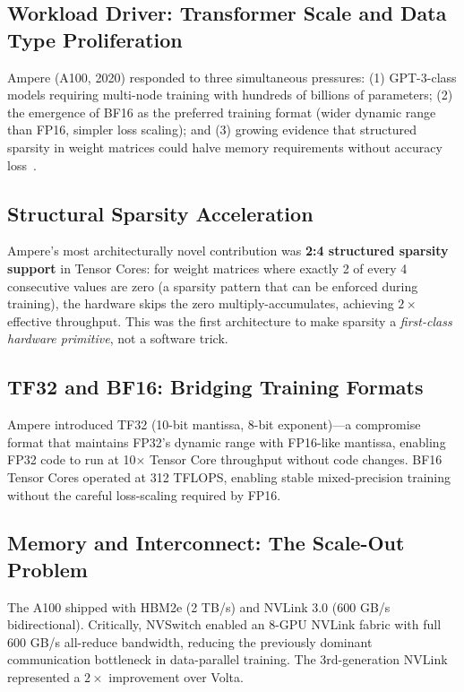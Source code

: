 \documentclass[10pt,twocolumn]{article}
\begin{document}
\subsection{Workload Driver: Transformer Scale and Data Type Proliferation}

Ampere (A100, 2020) responded to three simultaneous pressures: (1) GPT-3-class models requiring multi-node training with hundreds of billions of parameters; (2) the emergence of BF16 as the preferred training format (wider dynamic range than FP16, simpler loss scaling); and (3) growing evidence that structured sparsity in weight matrices could halve memory requirements without accuracy loss~\citep{mishra2021accelerating}.

\subsection{Structural Sparsity Acceleration}

Ampere's most architecturally novel contribution was \textbf{2:4 structured sparsity support} in Tensor Cores: for weight matrices where exactly 2 of every 4 consecutive values are zero (a sparsity pattern that can be enforced during training), the hardware skips the zero multiply-accumulates, achieving $2\times$ effective throughput. This was the first architecture to make sparsity a \textit{first-class hardware primitive}, not a software trick.

\subsection{TF32 and BF16: Bridging Training Formats}

Ampere introduced TF32 (10-bit mantissa, 8-bit exponent)—a compromise format that maintains FP32's dynamic range with FP16-like mantissa, enabling FP32 code to run at 10$\times$ Tensor Core throughput without code changes. BF16 Tensor Cores operated at 312 TFLOPS, enabling stable mixed-precision training without the careful loss-scaling required by FP16.

\subsection{Memory and Interconnect: The Scale-Out Problem}

The A100 shipped with HBM2e (2 TB/s) and NVLink 3.0 (600 GB/s bidirectional). Critically, NVSwitch enabled an 8-GPU NVLink fabric with full 600 GB/s all-reduce bandwidth, reducing the previously dominant communication bottleneck in data-parallel training. The 3rd-generation NVLink represented a $2\times$ improvement over Volta.
\end{document}
